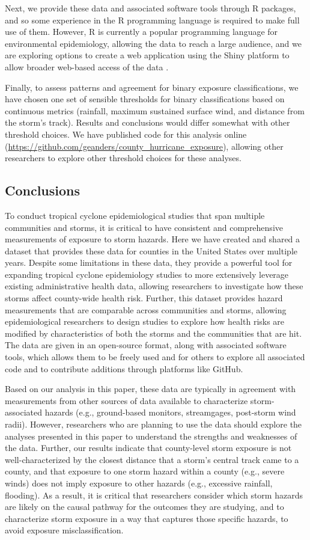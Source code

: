 Next, we provide these data and associated software tools through R packages,
and so some experience in the R programming language is required to make full
use of them. However, R is currently a popular programming language for
environmental epidemiology, allowing the data to reach a large audience, and we
are exploring options to create a web application using the Shiny platform to
allow broader web-based access of the data \parencite{shiny2019}.  

Finally, to assess patterns and agreement for binary exposure classifications,
we have chosen one set of sensible thresholds for binary classifications based
on continuous metrics (rainfall, maximum sustained surface wind, and distance
from the storm's track).  Results and conclusions would differ somewhat with
other threshold choices. We have published code for this analysis online
(\url{https://github.com/geanders/county_hurricane_exposure}), allowing other
researchers to explore other threshold choices for these analyses.

\subsection*{Conclusions}

To conduct tropical cyclone epidemiological studies that span multiple
communities and storms, it is critical to have consistent and comprehensive
measurements of exposure to storm hazards. Here we have created and shared a
dataset that provides these data for counties in the United States over
multiple years. Despite some limitations in these data, they provide a powerful
tool for expanding tropical cyclone epidemiology studies to more extensively
leverage existing administrative health data, allowing researchers to
investigate how these storms affect county-wide health risk.  Further, this
dataset provides hazard measurements that are comparable across communities and
storms, allowing epidemiological researchers to design studies to explore
how health risks are modified by characteristics of both the storms and the
communities that are hit. The data are given in an open-source format, along
with associated software tools, which allows them to be freely used and for
others to explore all associated code and to contribute additions through
platforms like GitHub.

Based on our analysis in this paper, these data are typically in agreement with
measurements from other sources of data available to characterize
storm-associated hazards (e.g., ground-based monitors, streamgages, post-storm
wind radii).  However, researchers who are planning to use the data
should explore the analyses presented in this paper to understand the strengths
and weaknesses of the data.  Further, our results indicate that county-level storm
exposure is not well-characterized by the closest distance that a storm's
central track came to a county, and that exposure to one storm hazard within a
county (e.g., severe winds) does not imply exposure to other hazards (e.g.,
excessive rainfall, flooding). As a result, it is critical that researchers
consider which storm hazards are likely on the causal pathway for the outcomes
they are studying, and to characterize storm exposure in a way that captures
those specific hazards, to avoid exposure misclassification. 

